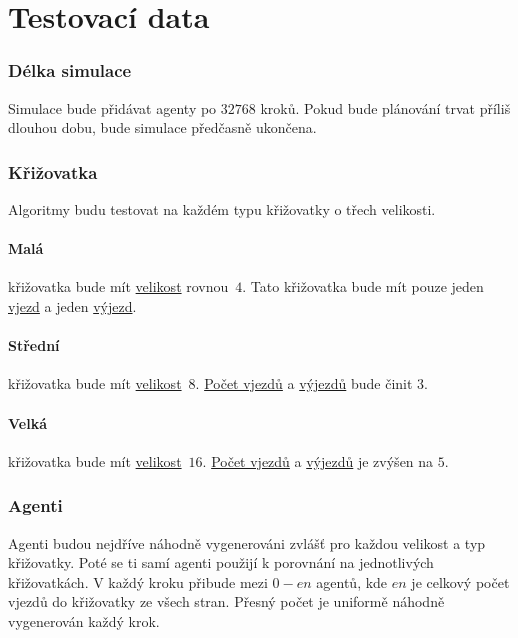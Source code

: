 \section{Testovací data}\label{sec:testovaci_data}


\subsubsection{Délka simulace}

Simulace bude přidávat agenty po $32768$ kroků.
Pokud bude plánování trvat příliš dlouhou dobu, bude simulace předčasně ukončena.

\subsubsection{Křižovatka}

Algoritmy budu testovat na každém typu křižovatky o třech velikosti.
\paragraph{Malá}\label{par:data_mala} křižovatka bude mít \hyperref[par:velikost_krizovatky]{velikost} rovnou~$4$.
Tato křižovatka bude mít pouze jeden \hyperref[par:vjezdy]{vjezd} a jeden \hyperref[par:vyjezdy]{výjezd}.
\paragraph{Střední}\label{par:data_stredni} křižovatka bude mít \hyperref[par:velikost_krizovatky]{velikost}~$8$.
\hyperref[par:vjezdy]{Počet vjezdů} a \hyperref[par:vyjezdy]{výjezdů} bude činit $3$.
\paragraph{Velká}\label{par:data_velka} křižovatka bude mít \hyperref[par:velikost_krizovatky]{velikost}~$16$.
\hyperref[par:vjezdy]{Počet vjezdů} a \hyperref[par:vyjezdy]{výjezdů} je zvýšen na $5$.

\subsubsection{Agenti}

Agenti budou nejdříve náhodně vygenerováni zvlášť pro každou velikost a typ křižovatky.
Poté se ti samí agenti použijí k porovnání na jednotlivých křižovatkách.
V každý kroku přibude mezi $0 - en$ agentů, kde $en$ je celkový počet vjezdů do křižovatky ze všech stran.
Přesný počet je uniformě náhodně vygenerován každý krok.

